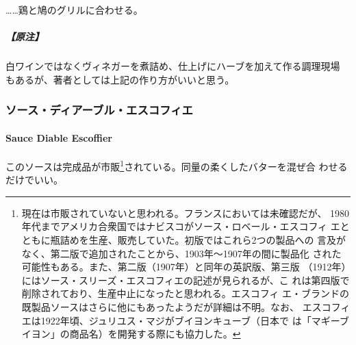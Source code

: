 \begin{recette}
\ldots{}\ldots{}鶏と鳩のグリルに合わせる。

\hypertarget{ux539fux6ce8}{%
\subparagraph{【原注】}\label{ux539fux6ce8}}

白ワインではなくヴィネガーを煮詰め、仕上げにハーブを加えて作る調理現場
もあるが、著者としては上記の作り方がいいと思う。

\maeaki

\hypertarget{ux30bdux30fcux30b9ux30c7ux30a3ux30a2ux30fcux30d6ux30ebux30a8ux30b9ux30b3ux30d5ux30a3ux30a8}{%
\subsubsection{ソース・ディアーブル・エスコフィエ}\label{ux30bdux30fcux30b9ux30c7ux30a3ux30a2ux30fcux30d6ux30ebux30a8ux30b9ux30b3ux30d5ux30a3ux30a8}}

\hypertarget{sauce-diable-escoffier}{%
\paragraph{Sauce Diable Escoffier}\label{sauce-diable-escoffier}}


このソースは完成品が市販\footnote{現在は市販されていないと思われる。フランスにおいては未確認だが、
  1980年代までアメリカ合衆国ではナビスコがソース・ロベール・エスコフィ
  エとともに瓶詰めを生産、販売していた。初版ではこれら2つの製品への
  言及がなく、第二版で追加されたことから、1903年〜1907年の間に製品化
  された可能性もある。また、第二版（1907年）と同年の英訳版、第三版
  （1912年）にはソース・スリーズ・エスコフィエの記述が見られるが、こ
  れは第四版で削除されており、生産中止になったと思われる。エスコフィ
  エ・ブランドの既製品ソースはさらに他にもあったようだが詳細は不明。なお、
  エスコフィエは1922年頃、ジュリユス・マジがブイヨンキューブ（日本で
  は「マギーブイヨン」の商品名）を開発する際にも協力した。}されている。同量の柔くしたバターを混ぜ合
わせるだけでいい。


\end{recette}
